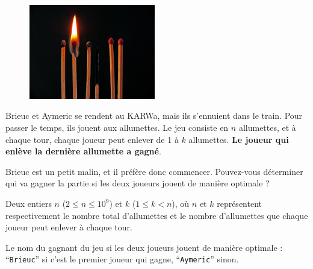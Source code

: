 \problemname{\problemyamlname}


\begin{figure}
	\centering
	\includegraphics[width=5.5cm]{allumettes.jpg}
\end{figure}
Brieuc et Aymeric se rendent au KARWa, mais ils s'ennuient dans le train. Pour passer le temps, ils jouent aux allumettes. Le jeu consiste en $n$ allumettes,
et à chaque tour, chaque joueur peut enlever de 1 à $k$ allumettes. \textbf{Le joueur qui enlève la dernière allumette a gagné}.

Brieuc est un petit malin, et il préfère donc commencer. Pouvez-vous déterminer qui va gagner la partie si les deux joueurs jouent de manière optimale ?

\begin{Input}
	Deux entiers $n$ ($2 \le n \le 10^9$) et $k$ ($1 \le k < n$), où $n$ et $k$ représentent respectivement le nombre total d'allumettes et le nombre d'allumettes que chaque joueur peut enlever à chaque tour.
\end{Input}

\begin{Output}
	Le nom du gagnant du jeu si les deux joueurs jouent de manière optimale : ``\verb|Brieuc|'' si c'est le premier joueur qui gagne, ``\verb|Aymeric|'' sinon.
\end{Output}
